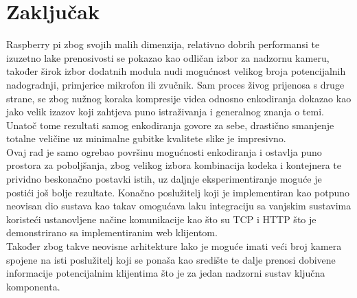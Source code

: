 \section{Zaključak}
Raspberry pi zbog svojih malih dimenzija, relativno dobrih performansi te izuzetno lake prenosivosti se pokazao kao
odličan izbor za nadzornu kameru, također širok izbor dodatnih modula nudi mogućnost velikog broja potencijalnih
nadogradnji, primjerice mikrofon ili zvučnik.
\paraBreak
Sam proces živog prijenosa s druge strane, se zbog nužnog koraka kompresije videa odnosno enkodiranja dokazao
kao jako velik izazov koji zahtjeva puno istraživanja i generalnog znanja o temi. 
\\
Unatoč tome rezultati samog enkodiranja govore za sebe, drastično smanjenje totalne veličine uz minimalne gubitke 
kvalitete slike je impresivno.
\\
Ovaj rad je samo ogrebao površinu mogućnosti enkodiranja i ostavlja puno prostora za poboljšanja, zbog velikog izbora
kombinacija kodeka i kontejnera te prividno beskonačno postavki istih, uz daljnje eksperimentiranje moguće je
postići još bolje rezultate.
\paraBreak
Konačno poslužitelj koji je implementiran kao potpuno neovisan dio sustava kao takav omogućava laku integraciju sa
vanjskim sustavima koristeći ustanovljene načine komunikacije kao što su TCP i HTTP što je demonstrirano sa
implementiranim web klijentom.
\\
Također zbog takve neovisne arhitekture lako je moguće imati veći broj kamera spojene na isti poslužitelj koji se 
ponaša kao središte te dalje prenosi dobivene informacije potencijalnim klijentima što je za jedan nadzorni sustav 
ključna komponenta.
